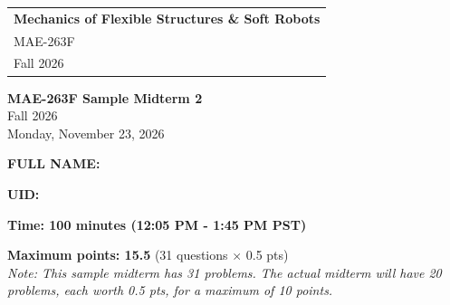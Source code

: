 \documentclass[letterpaper,11pt]{article}
\begin{document}
\thispagestyle{empty}

\begin{tabular}{p{15.5cm}}
{\large \bf Mechanics of Flexible Structures \& Soft Robots} \\
MAE-263F \\ Fall 2026 \\
\hline
\end{tabular}

\vspace*{0.3cm}

\begin{center}
    {\Huge \bf MAE-263F Sample Midterm 2} \\
    \vspace*{0.5cm}
    {\Large Fall 2026} \\
    \vspace*{0.5cm}
    {\Large Monday, November 23, 2026}
\end{center}

\vspace*{0.5cm}

{\Large \bf FULL NAME:} \underline{\hspace{10cm}} \\
\vspace*{0.3cm}

{\Large \bf UID:} \underline{\hspace{10cm}}\\
\vspace*{0.3cm}

{\Large \bf Time: 100 minutes (12:05 PM - 1:45 PM PST)}\\
\vspace*{0.3cm}

{\Large \bf Maximum points: 15.5} \quad (31 questions $\times$ 0.5 pts)\\
\textit{Note: This sample midterm has 31 problems. The actual midterm will have 20 problems, each worth 0.5 pts, for a maximum of 10 points.}

\vspace{0.3cm}
\end{document}

